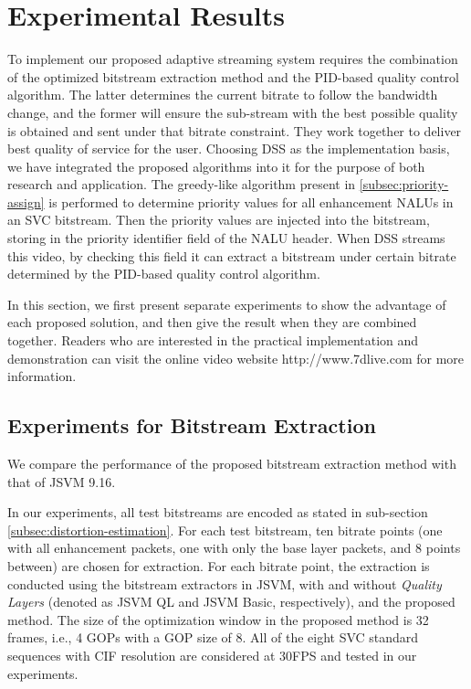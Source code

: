 \documentclass[journal]{IEEEtran}
\begin{document}
\section{Experimental Results}
\label{sec:experiment}

To implement our proposed adaptive streaming system requires the combination of the optimized bitstream extraction method and the PID-based quality control algorithm. The latter determines the current bitrate to follow the bandwidth change, and the former will ensure the sub-stream with the best possible quality is obtained and sent under that bitrate constraint. They work together to deliver best quality of service for the user. Choosing DSS as the implementation basis, we have integrated the proposed algorithms into it for the purpose of both research and application. The greedy-like algorithm present in \ref{subsec:priority-assign} is performed to determine priority values for all enhancement NALUs in an SVC bitstream. Then the priority values are injected into the bitstream, storing in the priority identifier field of the NALU header. When DSS streams this video, by checking this field it can extract a bitstream under certain bitrate determined by the PID-based quality control algorithm.

In this section, we first present separate experiments to show the advantage of each proposed solution, and then give the result when they are combined together. Readers who are interested in the practical implementation and demonstration can visit the online video website http://www.7dlive.com for more information.

\subsection{Experiments for Bitstream Extraction}
\label{subsec:exp-extraction}

We compare the performance of the proposed bitstream extraction method with that of JSVM 9.16.

In our experiments, all test bitstreams are encoded as stated in sub-section \ref{subsec:distortion-estimation}. For each test bitstream, ten bitrate points (one with all enhancement packets, one with only the base layer packets, and 8 points between) are chosen for extraction. For each bitrate point, the extraction is conducted using the bitstream extractors in JSVM, with and without \textit{Quality Layers} (denoted as JSVM QL and JSVM Basic, respectively), and the proposed method. The size of the optimization window in the proposed method is 32 frames, i.e., 4 GOPs with a GOP size of 8. All of the eight SVC standard sequences with CIF resolution are considered at 30FPS and tested in our experiments.
\end{document}
